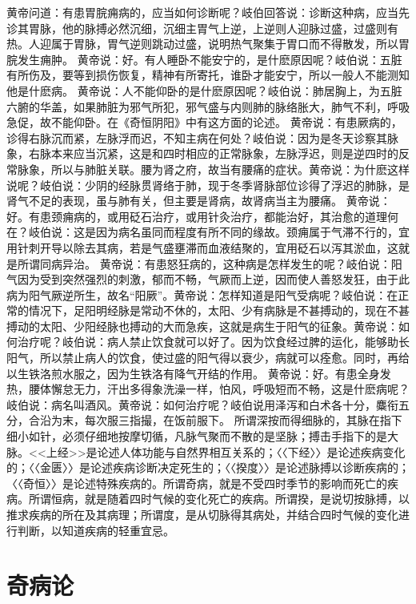 \documentclass[a4paper,12pt,UTF8,twoside]{ctexbook}
\begin{document}
黄帝问道：有患胃脘痈病的，应当如何诊断呢？岐伯回答说：诊断这种病，应当先诊其胃脉，他的脉搏必然沉细，沉细主胃气上逆，上逆则人迎脉过盛，过盛则有热。人迎属于胃脉，胃气逆则跳动过盛，说明热气聚集于胃口而不得散发，所以胃脘发生痈肿。
黄帝说：好。有人睡卧不能安宁的，是什麽原因呢？岐伯说：五脏有所伤及，要等到损伤恢复，精神有所寄托，谁卧才能安宁，所以一般人不能测知他是什麽病。
黄帝说：人不能仰卧的是什麽原因呢？岐伯说：肺居胸上，为五脏六腑的华盖，如果肺脏为邪气所犯，邪气盛与内则肺的脉络胀大，肺气不利，呼吸急促，故不能仰卧。在《奇恒阴阳》中有这方面的论述。
黄帝说：有患厥病的，诊得右脉沉而紧，左脉浮而迟，不知主病在何处？岐伯说：因为是冬天诊察其脉象，右脉本来应当沉紧，这是和四时相应的正常脉象，左脉浮迟，则是逆四时的反常脉象，所以与肺脏关联。腰为肾之府，故当有腰痛的症状。黄帝说：为什麽这样说呢？岐伯说：少阴的经脉贯肾络于肺，现于冬季肾脉部位诊得了浮迟的肺脉，是肾气不足的表现，虽与肺有关，但主要是肾病，故肾病当主为腰痛。
黄帝说：好。有患颈痈病的，或用砭石治疗，或用针灸治疗，都能治好，其治愈的道理何在？岐伯说：这是因为病名虽同而程度有所不同的缘故。颈痈属于气滞不行的，宜用针刺开导以除去其病，若是气盛壅滞而血液结聚的，宜用砭石以泻其淤血，这就是所谓同病异治。
黄帝说：有患怒狂病的，这种病是怎样发生的呢？岐伯说：阳气因为受到突然强烈的刺激，郁而不畅，气厥而上逆，因而使人善怒发狂，由于此病为阳气厥逆所生，故名“阳厥”。黄帝说：怎样知道是阳气受病呢？岐伯说：在正常的情况下，足阳明经脉是常动不休的，太阳、少有病脉是不甚搏动的，现在不甚搏动的太阳、少阳经脉也搏动的大而急疾，这就是病生于阳气的征象。黄帝说：如何治疗呢？岐伯说：病人禁止饮食就可以好了。因为饮食经过脾的运化，能够助长阳气，所以禁止病人的饮食，使过盛的阳气得以衰少，病就可以痊愈。同时，再给以生铁洛煎水服之，因为生铁洛有降气开结的作用。
黄帝说：好。有患全身发热，腰体懈怠无力，汗出多得象洗澡一样，怕风，呼吸短而不畅，这是什麽病呢？岐伯说：病名叫酒风。黄帝说：如何治疗呢？岐伯说用泽泻和白术各十分，麋衔五分，合沿为末，每次服三指撮，在饭前服下。
所谓深按而得细脉的，其脉在指下细小如针，必须仔细地按摩切循，凡脉气聚而不散的是坚脉；搏击手指下的是大脉。<<上经>>是论述人体功能与自然界相互关系的；〈〈下经〉〉是论述疾病变化的；〈〈金匮〉〉是论述疾病诊断决定死生的；〈〈揆度〉〉是论述脉搏以诊断疾病的；〈〈奇恒〉〉是论述特殊疾病的。所谓奇病，就是不受四时季节的影响而死亡的疾病。所谓恒病，就是随着四时气候的变化死亡的疾病。所谓揆，是说切按脉搏，以推求疾病的所在及其病理；所谓度，是从切脉得其病处，并结合四时气候的变化进行判断，以知道疾病的轻重宜忌。

\chapter{奇病论}
\end{document}
